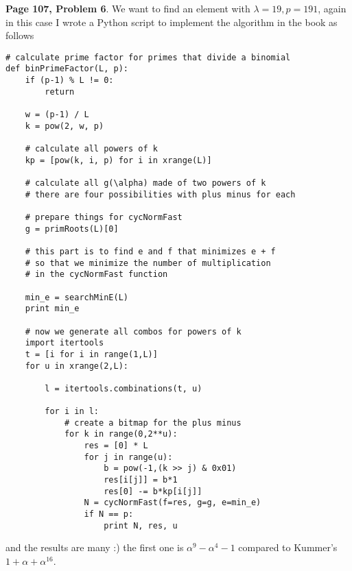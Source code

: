 \documentclass[aps,preprint,preprintnumbers,nofootinbib,showpacs,prd]{revtex4-1}
\begin{document}
{\bf Page 107, Problem 6}. We want to find an element with $\lambda = 19, p = 191$, again in this case I wrote a Python script to implement the algorithm in the book as follows
%
\begin{Verbatim}[baselinestretch=0.75]
# calculate prime factor for primes that divide a binomial
def binPrimeFactor(L, p):
    if (p-1) % L != 0:
        return

    w = (p-1) / L
    k = pow(2, w, p)

    # calculate all powers of k
    kp = [pow(k, i, p) for i in xrange(L)]

    # calculate all g(\alpha) made of two powers of k
    # there are four possibilities with plus minus for each

    # prepare things for cycNormFast
    g = primRoots(L)[0]

    # this part is to find e and f that minimizes e + f
    # so that we minimize the number of multiplication
    # in the cycNormFast function
    
    min_e = searchMinE(L)
    print min_e

    # now we generate all combos for powers of k
    import itertools
    t = [i for i in range(1,L)]
    for u in xrange(2,L):
        
        l = itertools.combinations(t, u)

        for i in l:
            # create a bitmap for the plus minus
            for k in range(0,2**u):
                res = [0] * L
                for j in range(u):
                    b = pow(-1,(k >> j) & 0x01)
                    res[i[j]] = b*1
                    res[0] -= b*kp[i[j]]
                N = cycNormFast(f=res, g=g, e=min_e)
                if N == p:
                    print N, res, u
\end{Verbatim}
%
and the results are many :) the first one is $\alpha^9 - \alpha^4 - 1$ compared to Kummer's $1 + \alpha + \alpha^{16}$.
\end{document}
